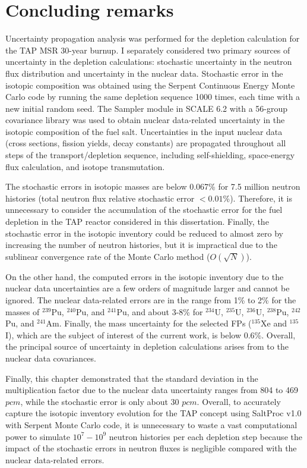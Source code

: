 \section{Concluding remarks}
Uncertainty propagation analysis was performed for the depletion calculation 
for the \gls{TAP} \gls{MSR} 30-year burnup. I separately considered two 
primary sources of uncertainty in the depletion calculations: stochastic 
uncertainty in the neutron flux distribution and uncertainty in the nuclear 
data. Stochastic error in the isotopic composition was obtained using the 
Serpent Continuous Energy Monte Carlo code by running the same depletion 
sequence 1000 times, each time with a new initial random seed. The 
Sampler module in SCALE 6.2 with a 56-group covariance library was used to 
obtain nuclear data-related uncertainty in the isotopic composition of the 
fuel salt. 
Uncertainties in the input nuclear data (cross sections, fission yields, decay 
constants) are propagated throughout all steps of the transport/depletion 
sequence, including self-shielding, space-energy flux calculation, and isotope 
transmutation. 

The stochastic errors in isotopic masses are below 0.067\% 
for 7.5 million neutron histories (total neutron flux relative stochastic 
error $<0.01$\%). Therefore, it is unnecessary to consider the accumulation of 
the stochastic error for the fuel depletion in the \gls{TAP} reactor 
considered in this dissertation.
Finally, the stochastic error in the isotopic inventory could be reduced to 
almost zero by increasing the number of neutron histories, but it is 
impractical due to the sublinear convergence rate of the Monte Carlo method 
($O(\sqrt{N})$).

On the other hand, the computed errors in the isotopic inventory due to the 
nuclear data uncertainties are a few orders of magnitude larger and cannot 
be ignored. The nuclear data-related errors are in the range from 1\% to 2\% 
for the masses of $^{239}$Pu, $^{240}$Pu, and $^{241}$Pu, and about 3-8\% for  
$^{234}$U, $^{235}$U, $^{236}$U, $^{238}$Pu, $^{242}$Pu, and $^{241}$Am. 
Finally, the mass uncertainty for the selected \glspl{FP} ($^{135}$Xe and 
$^{135}$I), which are the subject of interest of the current work, is below 
0.6\%. Overall, the principal source of uncertainty in depletion calculations 
arises from to the nuclear data covariances.

Finally, this chapter demonstrated that the standard deviation in the 
multiplication factor due to the nuclear data uncertainty ranges from 804 to 
469 $pcm$, while the stochastic error is only about 30 $pcm$. Overall, to 
accurately capture the isotopic inventory evolution for the \gls{TAP} concept 
using SaltProc v1.0 with Serpent Monte Carlo code, it is unnecessary to 
waste a vast computational power to simulate $10^7-10^9$ neutron histories per 
each depletion step because the impact of the stochastic errors in 
neutron fluxes is negligible compared with the nuclear data-related errors.